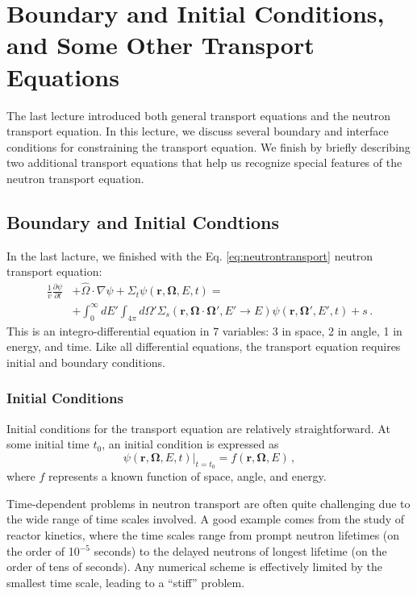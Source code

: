\chapter[Boundary Conditions]{Boundary and Initial Conditions, and Some Other Transport Equations}

The last lecture introduced both general transport equations and the neutron transport equation.  In this lecture, we discuss several boundary and interface conditions for constraining the transport equation.  We finish by briefly describing two additional transport equations that help us recognize special features of the neutron transport equation.

\section*{Boundary and Initial Condtions}

In the last lacture, we finished with the Eq. \ref{eq:neutrontransport} neutron transport equation:
\begin{equation*}
  \begin{split}
     \frac{1}{v}\frac{\partial \psi}{\partial t} &+ \hat{\Omega} \cdot \nabla \psi + \Sigma_t \psi(\mathbf{r},\mathbf{\Omega},E,t) = \\
           &+ \int^{\infty}_{0} dE' \int_{4\pi} d\Omega' \Sigma_s(\mathbf{r},\mathbf{\Omega}\cdot\mathbf{\Omega}',E'\to E)\psi(\mathbf{r},\mathbf{\Omega'},E',t) +s \, .
  \end{split}
\end{equation*}
This is an integro-differential equation in 7 variables: 3 in space, 2 in angle, 1 in energy, and time.  Like all differential equations, the transport equation requires initial and boundary conditions. 

\subsection*{Initial Conditions}

Initial conditions for the transport equation are relatively straightforward.  At some initial time $t_0$, an initial condition is expressed as
\begin{equation}
 \psi(\mathbf{r},\mathbf{\Omega},E,t)|_{t=t_0} = f(\mathbf{r},\mathbf{\Omega},E) \, ,
\end{equation}
where $f$ represents a known function of space, angle, and energy.  

Time-dependent problems in neutron transport are often quite challenging due to the wide range of time scales involved.  A good example comes from the study of reactor kinetics, where the time scales range from prompt neutron lifetimes (on the order of 10$^{-5}$ seconds) to the delayed neutrons of longest lifetime (on the order of tens of seconds).  Any numerical scheme is effectively limited by the smallest time scale, leading to a ``stiff'' problem.  

